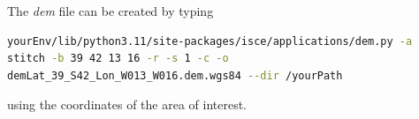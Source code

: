 The \emph{dem} file can be created by typing
\begin{lstlisting}[language=bash]  
yourEnv/lib/python3.11/site-packages/isce/applications/dem.py -a 
stitch -b 39 42 13 16 -r -s 1 -c -o 
demLat_39_S42_Lon_W013_W016.dem.wgs84 --dir /yourPath
\end{lstlisting}
using the coordinates of the area of interest.




